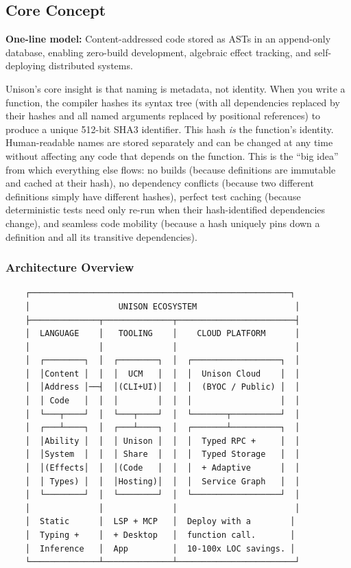 \documentclass[11pt,letterpaper]{article}
\begin{document}
\subsection{Core Concept}

\textbf{One-line model:} Content-addressed code stored as ASTs in an append-only database, enabling zero-build development, algebraic effect tracking, and self-deploying distributed systems.

Unison's core insight is that naming is metadata, not identity. When you write a function, the compiler hashes its syntax tree (with all dependencies replaced by their hashes and all named arguments replaced by positional references) to produce a unique 512-bit SHA3 identifier. This hash \emph{is} the function's identity. Human-readable names are stored separately and can be changed at any time without affecting any code that depends on the function. This is the ``big idea'' from which everything else flows: no builds (because definitions are immutable and cached at their hash), no dependency conflicts (because two different definitions simply have different hashes), perfect test caching (because deterministic tests need only re-run when their hash-identified dependencies change), and seamless code mobility (because a hash uniquely pins down a definition and all its transitive dependencies).

\subsubsection{Architecture Overview}

\begin{asciibox}
\begin{verbatim}
    ┌─────────────────────────────────────────────────────┐
    │                  UNISON ECOSYSTEM                    │
    ├──────────────┬──────────────┬────────────────────────┤
    │  LANGUAGE    │   TOOLING    │    CLOUD PLATFORM      │
    │              │              │                        │
    │  ┌────────┐  │  ┌────────┐  │  ┌──────────────────┐  │
    │  │Content │  │  │  UCM   │  │  │  Unison Cloud    │  │
    │  │Address │──┤  │(CLI+UI)│  │  │  (BYOC / Public) │  │
    │  │ Code   │  │  │        │  │  │                  │  │
    │  └───┬────┘  │  └───┬────┘  │  └───────┬──────────┘  │
    │  ┌───┴────┐  │  ┌───┴────┐  │  ┌───────┴──────────┐  │
    │  │Ability │  │  │ Unison │  │  │  Typed RPC +     │  │
    │  │System  │  │  │ Share  │  │  │  Typed Storage   │  │
    │  │(Effects│  │  │(Code   │  │  │  + Adaptive      │  │
    │  │ Types) │  │  │Hosting)│  │  │  Service Graph   │  │
    │  └────────┘  │  └────────┘  │  └──────────────────┘  │
    │              │              │                        │
    │  Static      │  LSP + MCP   │  Deploy with a        │
    │  Typing +    │  + Desktop   │  function call.       │
    │  Inference   │  App         │  10-100x LOC savings. │
    └──────────────┴──────────────┴────────────────────────┘
\end{verbatim}
\end{asciibox}
\end{document}
